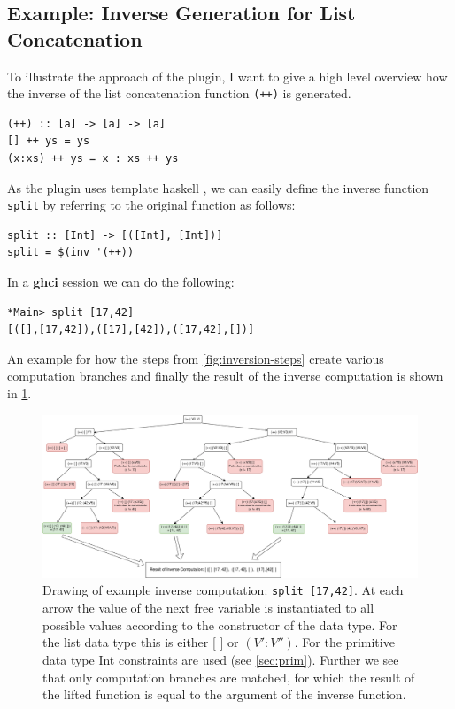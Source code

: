 \documentclass[12pt,a4paper, dvipsnames,usenames]{article}
\begin{document}
\subsection{Example: Inverse Generation for List Concatenation}

To illustrate the approach of the plugin, I want to give a high level
overview how the inverse of the list concatenation function \texttt{(++)}
is generated.
\begin{verbatim}
(++) :: [a] -> [a] -> [a]
[] ++ ys = ys
(x:xs) ++ ys = x : xs ++ ys
\end{verbatim}
As the plugin uses template haskell \cite{sheard2002template}, we can easily
define the inverse function \texttt{split} by referring to the original function as follows: \begin{verbatim}
split :: [Int] -> [([Int], [Int])]
split = $(inv '(++))
\end{verbatim}
In a \textbf{ghci} session we can do the following:
\begin{verbatim}
*Main> split [17,42]
[([],[17,42]),([17],[42]),([17,42],[])]
\end{verbatim}
An example for how the steps from \cref{fig:inversion-steps}
create various
computation branches and finally the result of the inverse computation is
shown in \cref{fig:inverse-comp}.

\begin{figure}[h]
\begin{minipage}{1.0\linewidth}
  \begin{center}
    \includegraphics[scale=0.115]{resources/inverse-computation-drawing.png}
    \caption{
      Drawing of example inverse computation: \texttt{split [17,42]}.
      At each arrow the value of the next free variable is instantiated
      to all possible values according
      to the constructor of the data type.
      For the list data type this is either [ ] or $(V':V'')$. For the primitive
      data type Int constraints are used (see \cref{sec:prim}). Further we see
      that only computation branches are matched, for which the result of the lifted
      function is equal to the argument of the inverse function.
    }
     \label{fig:inverse-comp}
  \end{center}
\end{minipage}
\end{figure}
\end{document}
